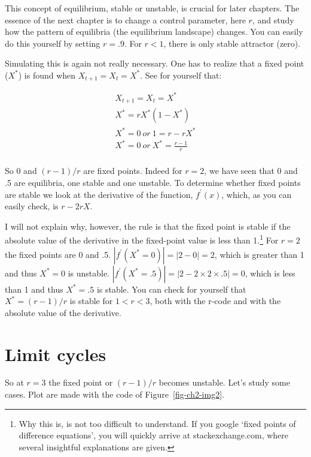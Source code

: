 \documentclass[
  a4paper,
  DIV=11,
  numbers=noendperiod,
  oneside]{scrreprt}
\begin{document}
This concept of equilibrium, stable or unstable, is crucial for later
chapters. The essence of the next chapter is to change a control
parameter, here \(r\), and study how the pattern of equilibria (the
equilibrium landscape) changes. You can easily do this yourself by
setting \(r = .9\). For \(r < 1\), there is only stable attractor
(zero).

Simulating this is again not really necessary. One has to realize that a
fixed point (\(X^{*}\)) is found when \(X_{t + 1} = X_{t} = X^{*}\). See
for yourself that:

\[
\begin{gathered}
X_{t + 1} = X_{t} = X^{*} \\
X^{*} = rX^{*}( 1 - X^{*}) \\
X^{*} = 0\ or\ 1 = r - rX^{*} \\
X^{*} = 0\ or\ X^{*} = \frac{r - 1}{r} \\
\end{gathered}
\]

So 0 and \((r - 1)/r\) are fixed points. Indeed for \(r = 2\), we have
seen that 0 and .5 are equilibria, one stable and one unstable. To
determine whether fixed points are stable we look at the derivative of
the function, \(f^{'}(x)\), which, as you can easily check, is
\(r - 2rX\).

I will not explain why, however, the rule is that the fixed point is
stable if the absolute value of the derivative in the fixed-point value
is less than 1.\footnote{Why this is, is not too difficult to
  understand. If you google `fixed points of difference equations', you
  will quickly arrive at stackexchange.com, where several insightful
  explanations are given.} For \(r = 2\) the fixed points are 0 and .5.
\(\left| f^{'}\left( X^{*} = 0 \right) \right| = |2 - 0| = 2\), which is
greater than 1 and thus \(X^{*} = 0\) is unstable.
\(\left| f^{'}\left( X^{*} = .5 \right) \right| = |2 - 2 \times 2 \times .5| = 0\),
which is less than 1 and thus \(X^{*} = .5\) is stable. You can check
for yourself that \(X^{*}=(r - 1)/r\) is stable for \(1 < r < 3\), both
with the r-code and with the absolute value of the derivative.

\hypertarget{sec-Limit-cycles}{%
\section{Limit cycles}\label{sec-Limit-cycles}}

So at \(r = 3\) the fixed point or \((r - 1)/r\) becomes unstable. Let's
study some cases. Plot are made with the code of
Figure~\ref{fig-ch2-img2}.
\end{document}
